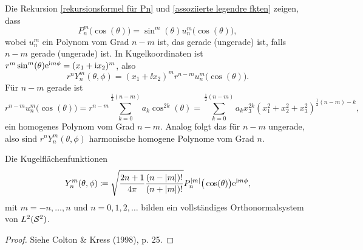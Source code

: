 Die Rekursion \eqref{rekursionsformel für Pn} und \eqref{assoziierte legendre fkten} zeigen, dass
\begin{equation*}
	P_n^m\big(\cos(\theta)\big)=\sin^m(\theta)u_n^m\big(\cos(\theta)\big),
\end{equation*}
wobei \(u_n^m\) ein Polynom vom Grad \(n-m\) ist, das gerade (ungerade) ist, falls \(n-m\) gerade (ungerade) ist. In Kugelkoordinaten ist \(r^m\sin^m(\theta)\mathrm{e}^{\mathrm{i} m\phi}=(x_1+\mathrm{i} x_2)^m\), also
\begin{equation*}
	r^nY_n^m(\theta,\phi)=(x_1+\ii x_2)^mr^{n-m}u_n^m\big(\cos(\theta)\big).
\end{equation*}
Für \(n-m\) gerade ist
\begin{equation*}
	r^{n-m}u_n^m\big(\cos(\theta)\big)=r^{n-m}\sum_{k=0}^{\frac{1}{2}(n-m)}a_k\cos^{2k}(\theta)=\sum_{k=0}^{\frac{1}{2}(n-m)}a_kx_3^{2k}(x_1^2+x_2^2+x_3^2)^{\frac{1}{2}(n-m)-k},
\end{equation*}
ein homogenes Polynom vom Grad \(n-m\). Analog folgt das für \(n-m\) ungerade, also sind \(r^nY_n^m(\theta,\phi)\) harmonische homogene Polynome vom Grad \(n\).
\begin{satz}\label{satz: kugelflächenfkten sind vollst ONS von L^2(S^2)}
	Die Kugelflächenfunktionen
	\begin{equation*}
		Y_n^m(\theta,\phi)\coloneqq\sqrt{\frac{2n+1}{4\pi}\frac{(n-|m|)!}{(n+|m|)!}}P_n^{|m|}\big(\cos(\theta)\big)\mathrm{e}^{\mathrm{i} m\phi},
	\end{equation*}
	mit \(m=-n,\ldots,n\) und \(n=0,1,2,\ldots\) bilden ein vollständiges Orthonormalsystem von \(L^2(\mathcal{S}^2)\).
\end{satz}
\begin{proof}
	Siehe Colton \& Kress (1998), p. 25.
\end{proof}

